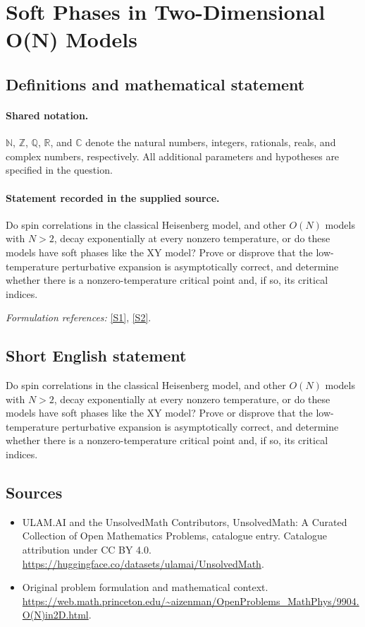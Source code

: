 \documentclass[11pt]{article}
\newcommand{\sref}[2]{\hyperlink{source:#1:#2}{[S#2]}}
\begin{document}
\section{Soft Phases in Two-Dimensional O(N) Models}\label{statement}

\subsection{Definitions and mathematical statement}

\paragraph{Shared notation.}$\mathbb N$, $\mathbb Z$, $\mathbb Q$, $\mathbb R$, and $\mathbb C$ denote the natural numbers, integers, rationals, reals, and complex numbers, respectively. All additional parameters and hypotheses are specified in the question.


\paragraph{Statement recorded in the supplied source.}
Do spin correlations in the classical Heisenberg model, and other $O(N)$ models with $N>2$, decay exponentially at every nonzero temperature, or do these models have soft phases like the XY model? Prove or disprove that the low-temperature perturbative expansion is asymptotically correct, and determine whether there is a nonzero-temperature critical point and, if so, its critical indices.
\par\smallskip\textit{Formulation references:} \sref{statement}{1}, \sref{statement}{2}.
\subsection{Short English statement}
Do spin correlations in the classical Heisenberg model, and other $O(N)$ models with $N>2$, decay exponentially at every nonzero temperature, or do these models have soft phases like the XY model? Prove or disprove that the low-temperature perturbative expansion is asymptotically correct, and determine whether there is a nonzero-temperature critical point and, if so, its critical indices.
\subsection{Sources}
\begin{itemize}
\item[\hypertarget{source:statement:1}{S1}] ULAM.AI and the UnsolvedMath Contributors, UnsolvedMath: A Curated Collection of Open Mathematics Problems, catalogue entry. Catalogue attribution under CC BY 4.0.
\url{https://huggingface.co/datasets/ulamai/UnsolvedMath}.
\item[\hypertarget{source:statement:2}{S2}] Original problem formulation and mathematical context.
\url{https://web.math.princeton.edu/~aizenman/OpenProblems_MathPhys/9904.O(N)in2D.html}.
\end{itemize}
\label{end:statement}
\end{document}
